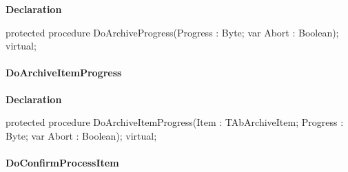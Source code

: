 \documentclass{report}
\newif\ifpdf
\begin{document}
\label{AbArcTyp.TAbArchive-DoArchiveProgress}
\begin{list}{}{
\setlength{\itemindent}{0cm}
\setlength{\listparindent}{0cm}
\setlength{\leftmargin}{\evensidemargin}
\addtolength{\leftmargin}{\tmplength}
\settowidth{\labelsep}{X}
\addtolength{\leftmargin}{\labelsep}
\setlength{\labelwidth}{\tmplength}
}
\item[\textbf{Declaration}\hfill]
\ifpdf
\begin{flushleft}
\fi
\begin{ttfamily}
protected procedure DoArchiveProgress(Progress : Byte; var Abort : Boolean); virtual;\end{ttfamily}

\ifpdf
\end{flushleft}
\fi

\end{list}
\paragraph*{DoArchiveItemProgress}\hspace*{\fill}

\label{AbArcTyp.TAbArchive-DoArchiveItemProgress}
\begin{list}{}{
\setlength{\itemindent}{0cm}
\setlength{\listparindent}{0cm}
\setlength{\leftmargin}{\evensidemargin}
\addtolength{\leftmargin}{\tmplength}
\settowidth{\labelsep}{X}
\addtolength{\leftmargin}{\labelsep}
\setlength{\labelwidth}{\tmplength}
}
\item[\textbf{Declaration}\hfill]
\ifpdf
\begin{flushleft}
\fi
\begin{ttfamily}
protected procedure DoArchiveItemProgress(Item : TAbArchiveItem; Progress : Byte; var Abort : Boolean); virtual;\end{ttfamily}

\ifpdf
\end{flushleft}
\fi

\end{list}
\paragraph*{DoConfirmProcessItem}\hspace*{\fill}
\end{document}
